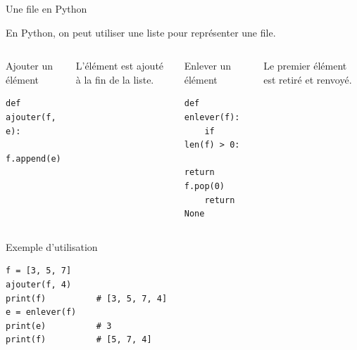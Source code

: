 \documentclass[10pt]{beamer}
\begin{document}
\begin{frame}[fragile]{Une file en Python}

En Python, on peut utiliser une liste pour représenter une file.

\begin{columns}[T]


\begin{block}{Ajouter un élément}
\begin{lstlisting}
def ajouter(f, e):
    f.append(e)
\end{lstlisting}
\end{block}
L'élément est ajouté à la fin de la liste.


\begin{block}{Enlever un élément}
\begin{lstlisting}
def enlever(f):
    if len(f) > 0:
        return f.pop(0)
    return None
\end{lstlisting}
\end{block}
Le premier élément est retiré et renvoyé.

\end{columns}

\medskip

\begin{exampleblock}{Exemple d'utilisation}
\begin{lstlisting}
f = [3, 5, 7]
ajouter(f, 4)
print(f)          # [3, 5, 7, 4]
e = enlever(f)
print(e)          # 3
print(f)          # [5, 7, 4]
\end{lstlisting}
\end{exampleblock}

\end{frame}
\end{document}
